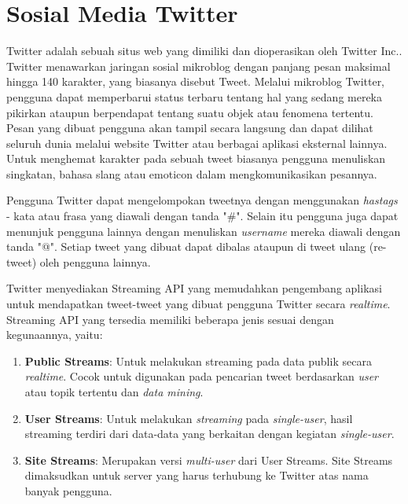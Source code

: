 \section{Sosial Media Twitter}
\label{sec:twitter}
Twitter adalah sebuah situs web yang dimiliki dan dioperasikan oleh Twitter Inc.. Twitter menawarkan jaringan sosial mikroblog dengan panjang pesan maksimal hingga 140 karakter, yang biasanya disebut Tweet. Melalui mikroblog Twitter, pengguna dapat memperbarui status terbaru tentang hal yang sedang mereka pikirkan ataupun berpendapat tentang suatu objek atau fenomena tertentu. Pesan yang dibuat pengguna akan tampil secara langsung dan dapat dilihat seluruh dunia melalui website Twitter atau berbagai aplikasi eksternal lainnya. Untuk menghemat karakter pada sebuah tweet biasanya pengguna menuliskan singkatan, bahasa slang atau emoticon dalam mengkomunikasikan pesannya. 

Pengguna Twitter dapat mengelompokan tweetnya dengan menggunakan \textit{hastags} - kata atau frasa yang diawali dengan tanda "\#". Selain itu pengguna juga dapat menunjuk pengguna lainnya dengan menuliskan \textit{username} mereka diawali dengan tanda "@". Setiap tweet yang dibuat dapat dibalas ataupun di tweet ulang (re-tweet) oleh pengguna lainnya.

Twitter menyediakan Streaming API yang memudahkan pengembang aplikasi untuk mendapatkan tweet-tweet yang dibuat pengguna Twitter secara \textit{realtime}. Streaming API yang tersedia memiliki beberapa jenis sesuai dengan kegunaannya, yaitu:

\begin{enumerate}
	\item \textbf{Public Streams}: Untuk melakukan streaming pada data publik secara \textit{realtime}. Cocok untuk digunakan pada pencarian tweet berdasarkan \textit{user} atau topik tertentu dan \textit{data mining}.
	\item \textbf{User Streams}: Untuk melakukan \textit{streaming} pada \textit{single-user}, hasil streaming terdiri dari data-data yang berkaitan dengan kegiatan \textit{single-user}.
	\item	\textbf{Site Streams}: Merupakan versi \textit{multi-user} dari User Streams. Site Streams dimaksudkan untuk server yang harus terhubung ke Twitter atas nama banyak pengguna.
\end{enumerate}

